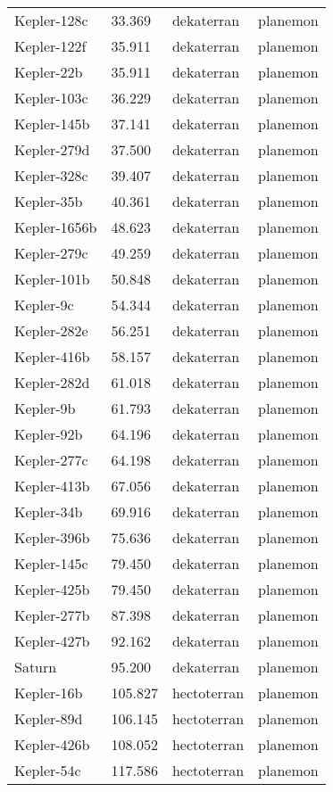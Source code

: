 \documentclass[
  letterpaper,
]{book}
\begin{document}
\begin{longtable}[]{@{}llll@{}}
Kepler-128c & 33.369 & dekaterran & planemon \\
Kepler-122f & 35.911 & dekaterran & planemon \\
Kepler-22b & 35.911 & dekaterran & planemon \\
Kepler-103c & 36.229 & dekaterran & planemon \\
Kepler-145b & 37.141 & dekaterran & planemon \\
Kepler-279d & 37.500 & dekaterran & planemon \\
Kepler-328c & 39.407 & dekaterran & planemon \\
Kepler-35b & 40.361 & dekaterran & planemon \\
Kepler-1656b & 48.623 & dekaterran & planemon \\
Kepler-279c & 49.259 & dekaterran & planemon \\
Kepler-101b & 50.848 & dekaterran & planemon \\
Kepler-9c & 54.344 & dekaterran & planemon \\
Kepler-282e & 56.251 & dekaterran & planemon \\
Kepler-416b & 58.157 & dekaterran & planemon \\
Kepler-282d & 61.018 & dekaterran & planemon \\
Kepler-9b & 61.793 & dekaterran & planemon \\
Kepler-92b & 64.196 & dekaterran & planemon \\
Kepler-277c & 64.198 & dekaterran & planemon \\
Kepler-413b & 67.056 & dekaterran & planemon \\
Kepler-34b & 69.916 & dekaterran & planemon \\
Kepler-396b & 75.636 & dekaterran & planemon \\
Kepler-145c & 79.450 & dekaterran & planemon \\
Kepler-425b & 79.450 & dekaterran & planemon \\
Kepler-277b & 87.398 & dekaterran & planemon \\
Kepler-427b & 92.162 & dekaterran & planemon \\
Saturn & 95.200 & dekaterran & planemon \\
Kepler-16b & 105.827 & hectoterran & planemon \\
Kepler-89d & 106.145 & hectoterran & planemon \\
Kepler-426b & 108.052 & hectoterran & planemon \\
Kepler-54c & 117.586 & hectoterran & planemon \\

\end{longtable}
\end{document}
